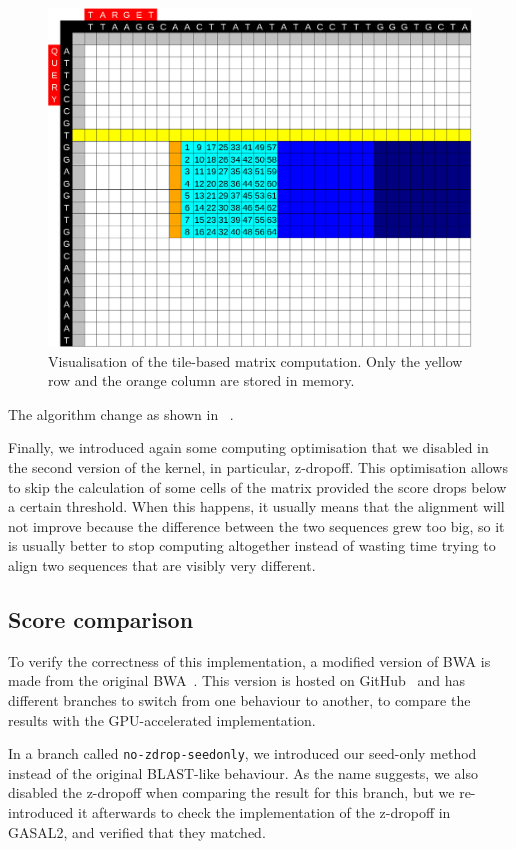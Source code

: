 \begin{figure}[h!]
	\centering
	\includegraphics[width=0.9\linewidth]{visualisation-aid-tile}
	\caption{Visualisation of the tile-based matrix computation. Only the yellow row and the orange column are stored in memory.}
	\label{fig:visualisation-aid-tile}
\end{figure}

The algorithm change as shown in ~\cite{Ahmed:gasal}.

Finally, we introduced again some computing optimisation that we disabled in the second version of the kernel, in particular, z-dropoff. This optimisation allows to skip the calculation of some cells of the matrix provided the score drops below a certain threshold. When this happens, it usually means that the alignment will not improve because the difference between the two sequences grew too big, so it is usually better to stop computing altogether instead of wasting time trying to align two sequences that are visibly very different.

\subsection{Score comparison}

To verify the correctness of this implementation, a modified version of BWA is made from the original BWA~\cite{lh3:bwa}. This version is hosted on GitHub~\cite{j-levy:bwa} and has different branches to switch from one behaviour to another, to compare the results with the GPU-accelerated implementation.

In a branch called \verb|no-zdrop-seedonly|, we introduced our seed-only method instead of the original BLAST-like behaviour. As the name suggests, we also disabled the z-dropoff when comparing the result for this branch, but we re-introduced it afterwards to check the implementation of the z-dropoff in GASAL2, and verified that they matched.

